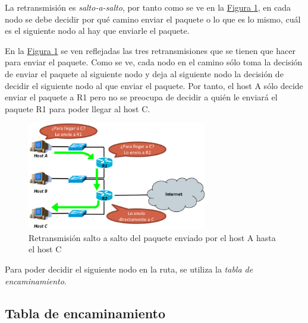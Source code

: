 \documentclass[10pt,a4paper,spanish]{report}
\begin{document}
La retransmisión es \textit{\textcolor{tema4}{salto-a-salto}}, por tanto como se ve en la \hyperref[saltosalto]{Figura \ref*{saltosalto}}, en cada nodo se debe decidir por qué camino enviar el paquete o lo que es lo mismo, cuál es el siguiente nodo al hay que enviarle el paquete. %

En la \hyperref[saltosalto]{Figura \ref*{saltosalto}} se ven reflejadas las tres retransmisiones que se tienen que hacer para enviar el paquete. Como se ve, cada nodo en el camino sólo toma la decisión de enviar el paquete al siguiente nodo y deja al siguiente nodo la decisión de decidir el siguiente nodo al que enviar el paquete. Por tanto, el host A sólo decide enviar el paquete a R1 pero no se preocupa de decidir a quién le enviará el paquete R1 para poder llegar al host C.

\begin{figure}[!h]
  \centering
  \includegraphics[width=0.7\textwidth]{saltosalto}
  \caption{Retransmisión salto a salto del paquete enviado por el host A hasta el host C}
  \label{saltosalto}
\end{figure}

Para poder decidir el siguiente nodo en la ruta, se utiliza la \textit{\textcolor{tema4}{tabla de encaminamiento}}.

\subsection{\textcolor{tema4}Tabla de encaminamiento}
\end{document}
